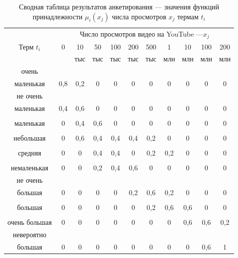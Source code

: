 \captionsetup{justification=raggedright,singlelinecheck=false}
\begin{table}[H]
	\begin{threeparttable}
		\caption{\label{tbl:exp}Сводная таблица результатов анкетирования --- значения функций принадлежности $\mu_i(x_j)$ числа просмотров $x_j$ термам $t_i$}
		\begin{tabular}{|c|c|c|c|c|c|c|c|c|c|c|}
			\hline
			& \multicolumn{10}{c|}{Число просмотров видео на YouTube ---$x_j$}\\\cline{2-11}
			Терм $t_i$ & 0&	10&	50&	100&	200&	500&	1 &	10 &	100 &	200\\
			& &	тыс&	тыс&	тыс&	тыс&тыс&млн &	млн &	млн& млн\\\hline
			очень &&&&&&&&&&\\
маленькая	&	0,8	&	0,2	&	0	&	0	&	0	&	0	&	0	&	0	&	0	&	0	\\\hline
не очень&&&&&&&&&&\\
 маленькая	&	0,4	&	0,6	&	0	&	0	&	0	&	0	&	0	&	0	&	0	&	0	\\\hline&&&&&&&&&&\\
маленькая	&	0	&	0,4	&	0,6	&	0	&	0	&	0	&	0	&	0	&	0	&	0	\\\hline&&&&&&&&&&\\
небольшая	&	0	&	0,6	&	0,4	&	0,4	&	0,4	&	0,2	&	0	&	0	&	0	&	0	\\\hline&&&&&&&&&&\\
средняя	&	0	&	0	&	0,4	&	0,4	&	0	&	0,2	&	0,2	&	0	&	0	&	0	\\\hline&&&&&&&&&&\\
немаленькая	&	0	&	0	&	0,2	&	0,4	&	0,6	&	0	&	0	&	0	&	0	&	0	\\\hline не очень &&&&&&&&&&\\
 большая	&	0	&	0	&	0	&	0	&	0,2	&	0,6	&	0,2	&	0	&	0	&	0	\\\hline&&&&&&&&&&\\
большая	&	0	&	0	&	0	&	0	&	0	&	0,2	&	0,6	&	0,6	&	0	&	0	\\\hline&&&&&&&&&&\\
очень большая	&	0	&	0	&	0	&	0	&	0	&	0	&	0	&	0,6	&	0,6	&	0,2	\\\hline невероятно&&&&&&&&&&\\
 большая	&	0	&	0	&	0	&	0	&	0	&	0	&	0	&	0	&	0,6	&	1	\\\hline
		\end{tabular}
	\end{threeparttable}
\end{table} 

